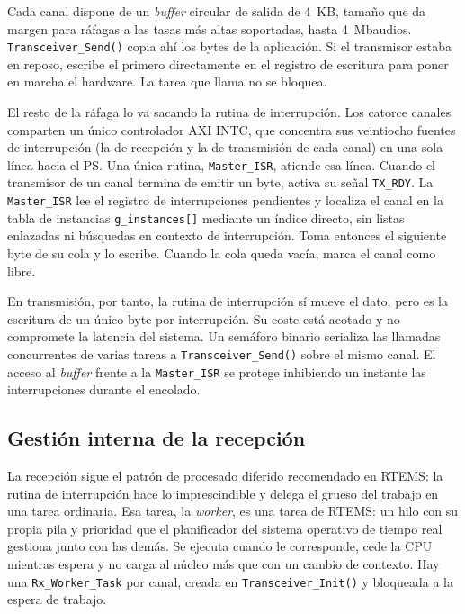 Cada canal dispone de un \textit{buffer} circular de salida de 4~KB, tamaño que da margen para
ráfagas a las tasas más altas soportadas, hasta 4~Mbaudios. \texttt{Transceiver\_Send()} copia ahí
los bytes de la aplicación. Si el transmisor estaba en reposo, escribe el primero directamente en
el registro de escritura para poner en marcha el hardware. La tarea que llama no se bloquea.

El resto de la ráfaga lo va sacando la rutina de interrupción. Los catorce canales comparten un
único controlador AXI INTC, que concentra sus veintiocho fuentes de interrupción (la de recepción y
la de transmisión de cada canal) en una sola línea hacia el PS. Una única rutina,
\texttt{Master\_ISR}, atiende esa línea. Cuando el transmisor de un canal termina de emitir un
byte, activa su señal \texttt{TX\_RDY}. La \texttt{Master\_ISR} lee el registro de interrupciones
pendientes y localiza el canal en la tabla de instancias \texttt{g\_instances[]} mediante un
índice directo, sin listas enlazadas ni búsquedas en contexto de interrupción. Toma entonces el
siguiente byte de su cola y lo escribe. Cuando la cola queda vacía, marca el canal como libre.

En transmisión, por tanto, la rutina de interrupción sí mueve el dato, pero es la escritura de un
único byte por interrupción. Su coste está acotado y no compromete la latencia del sistema. Un
semáforo binario serializa las llamadas concurrentes de varias tareas a \texttt{Transceiver\_Send()}
sobre el mismo canal. El acceso al \textit{buffer} frente a la \texttt{Master\_ISR} se protege
inhibiendo un instante las interrupciones durante el encolado.

\subsection{Gestión interna de la recepción}

La recepción sigue el patrón de procesado diferido recomendado en RTEMS: la rutina de interrupción
hace lo imprescindible y delega el grueso del trabajo en una tarea ordinaria. Esa tarea, la
\textit{worker}, es una tarea de RTEMS: un hilo con su propia pila y prioridad que el planificador
del sistema operativo de tiempo real gestiona junto con las demás. Se ejecuta cuando le
corresponde, cede la CPU mientras espera y no carga al núcleo más que con un cambio de contexto.
Hay una \texttt{Rx\_Worker\_Task} por canal, creada en \texttt{Transceiver\_Init()} y bloqueada a la
espera de trabajo.

